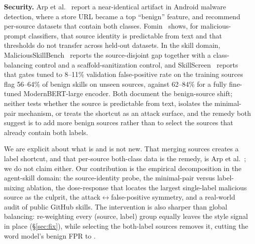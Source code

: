 \documentclass[conference]{IEEEtran}
\begin{document}
\textbf{Security.} Arp et al.~\cite{arp2022} report a near-identical artifact in Android malware detection,
where a store URL became a top ``benign'' feature, and recommend per-source datasets that contain both
classes. Fomin~\cite{fomin2026} shows, for malicious-prompt classifiers, that source identity is predictable
from text and that thresholds do not transfer across held-out datasets. In the skill domain,
MaliciousSkillBench~\cite{msb2026} reports the source-disjoint gap together with a class-balancing control
and a scaffold-sanitization control, and SkillScreen~\cite{skillscreen2026} reports that gates tuned to
8--11\% validation false-positive rate on the training sources flag 56--64\% of benign skills on unseen
sources, against 62--84\% for a fully fine-tuned ModernBERT-large encoder. Both document the benign-source
shift; neither tests whether the source is predictable from text, isolates the minimal-pair mechanism, or
treats the shortcut as an attack surface, and the remedy both suggest is to add more benign sources rather
than to select the sources that already contain both labels.

We are explicit about what is and is not new. That merging sources creates a label shortcut, and that
per-source both-class data is the remedy, is Arp et al.~\cite{arp2022}; we do not claim either. Our
contribution is the empirical decomposition in the agent-skill domain: the source-identity probe, the
minimal-pair versus label-mixing ablation, the dose-response that locates the largest single-label
malicious source as the culprit, the attack$\leftrightarrow$false-positive symmetry, and a real-world audit
of public GitHub skills. The intervention is also sharper than global balancing: re-weighting every
(source, label) group equally leaves the style signal in place (\S\ref{sec:fix}), while selecting the
both-label sources removes it, cutting the word model's benign FPR to \FprMixed{}.





\end{document}

